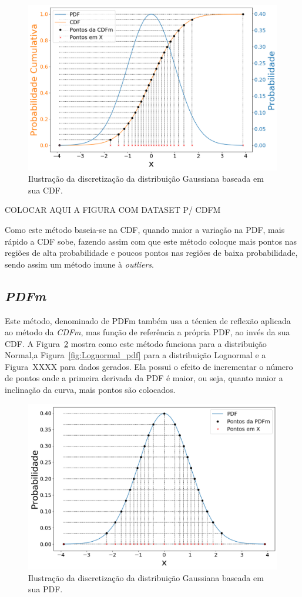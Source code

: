 \begin{figure}[H]
	\centering
	\includegraphics[width=0.6\linewidth]{./figuras/CDFm_normal_1}
	\caption{Ilustração da discretização da distribuição Gaussiana baseada em sua CDF.}
	\label{fig:CDFm_curve}
\end{figure}

\color{red} COLOCAR AQUI A FIGURA COM DATASET P/ CDFM \color{black}

Como este método baseia-se na \ac{CDF}, quando maior a variação na \ac{PDF}, mais rápido a CDF sobe, fazendo assim com que este método coloque mais pontos nas regiões de alta probabilidade e poucos pontos nas regiões de baixa probabilidade, sendo assim um método imune à \textit{outliers}.

\subsection{\textit{PDFm}}
Este método, denominado de \ac{PDFm} também usa a técnica de reflexão aplicada ao método da \textit{CDFm}, mas função de referência a própria \ac{PDF}, ao invés da sua \ac{CDF}. A Figura~\ref{fig:PDFm_curve} mostra como este método funciona para a distribuição Normal,a Figura~\ref{fig:Lognormal_pdf} para a distribuição Lognormal e a Figura~XXXX para dados gerados. Ela possui o efeito de incrementar o número de pontos onde a primeira derivada da \ac{PDF} é maior, ou seja, quanto maior a inclinação da curva, mais pontos são colocados.

\begin{figure}[H]
	\centering
	\includegraphics[width=0.67\linewidth]{./figuras/PDFm_normal_1}
	\caption{Ilustração da discretização da distribuição Gaussiana baseada em sua PDF.}
	\label{fig:PDFm_curve}
\end{figure}

